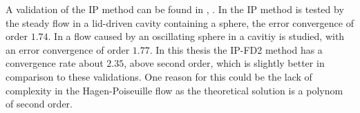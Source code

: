 A validation of the IP method can be found in \citep{Gilmanov2003}, \citep{Gilmanov2005}.
In \citep{Gilmanov2003} the IP method is tested by the steady flow in a lid-driven cavity containing a sphere, the error convergence of order $1.74$.
In  \citep{Gilmanov2005} a flow caused by an oscillating sphere in a cavitiy is studied, with an error convergence of order $1.77$.
In this thesis the IP-FD2 method has a convergence rate about $2.35$, above second order, which is slightly better in comparison to these validations.
One reason for this could be the lack of complexity in the Hagen-Poiseuille flow as the theoretical solution is a polynom of second order.





